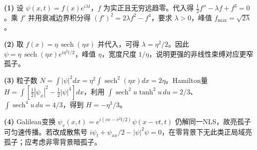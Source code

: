 \par\noindent\textbf{(1)} 设 \(\psi(x,t)=f(x)e^{i\lambda t}\)，\(f\) 为实正且无穷远趋零。代入得 \(\tfrac12f''-\lambda f+f^3=0\)。乘 \(f'\) 并用衰减边界积分得 \((f')^2=2\lambda f^2-f^4\)，要求 \(\lambda>0\)，峰值 \(f_{\max}=\sqrt{2\lambda}\)。
\par\noindent\textbf{(2)} 取 \(f(x)=\eta\,\operatorname{sech}(\eta x)\) 并代入，可得 \(\lambda=\eta^2/2\)。因此 \(\psi=\eta\,\operatorname{sech}(\eta x)e^{i\eta^2t/2}\)，峰值 \(\eta\)，宽度尺度 \(1/\eta\)，说明更强的非线性束缚对应更窄孤子。
\par\noindent\textbf{(3)} 粒子数 \(N=\int|\psi|^2dx=\eta^2\int\operatorname{sech}^2(\eta x)dx=2\eta\)。Hamilton量 \(H=\int[\tfrac12|\psi_x|^2-\tfrac12|\psi|^4]dx\)，利用 \(\int\operatorname{sech}^2u\tanh^2u\,du=2/3\)、\(\int\operatorname{sech}^4u\,du=4/3\)，得到 \(H=-\eta^3/3\)。
\par\noindent\textbf{(4)} Galilean变换 \(\psi_v(x,t)=e^{i(vx-v^2t/2)}\psi(x-vt,t)\) 仍解同一NLS，故亮孤子可匀速传播。若改成散焦号 \(i\psi_t+\psi_{xx}/2-|\psi|^2\psi=0\)，在零背景下无此类正局域亮孤子；应考虑非零背景暗孤子。
